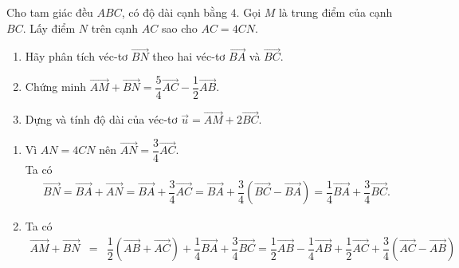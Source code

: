 \begin{bt}%
 Cho tam giác đều $ABC$, có độ dài cạnh bằng $4$. Gọi $M$ là trung điểm của cạnh $BC$. Lấy điểm $N$ trên cạnh $AC$ sao cho $AC=4CN$.
 \begin{enumerate}
  \item Hãy phân tích véc-tơ $\overrightarrow{BN}$ theo hai véc-tơ $\overrightarrow{BA}$ và $\overrightarrow{BC}$.
  \item Chứng minh $\overrightarrow{AM} + \overrightarrow{BN} = \dfrac{5}{4}\overrightarrow{AC}-\dfrac{1}{2}\overrightarrow{AB}$.
  \item Dựng và tính độ dài của véc-tơ $\overrightarrow{u}= \overrightarrow{AM} + 2\overrightarrow{BC}$.
 \end{enumerate}
 \loigiai
  {
  \begin{center}
  \end{center}
  \begin{enumerate}
   \item Vì $AN=4CN$ nên $\overrightarrow{AN}=\dfrac{3}{4}\overrightarrow{AC}$.\\
   Ta có
   \allowdisplaybreaks
   \begin{eqnarray*}
    \overrightarrow{BN} = \overrightarrow{BA} + \overrightarrow{AN} = \overrightarrow{BA} + \dfrac{3}{4}\overrightarrow{AC} = \overrightarrow{BA} + \dfrac{3}{4} \left(\overrightarrow{BC} - \overrightarrow{BA}\right) = \dfrac{1}{4}\overrightarrow{BA} + \dfrac{3}{4}\overrightarrow{BC}.
   \end{eqnarray*}
   \item Ta có
   \allowdisplaybreaks
   \begin{eqnarray*}
    \overrightarrow{AM} + \overrightarrow{BN} &=& \dfrac{1}{2}\left(\overrightarrow{AB} + \overrightarrow{AC}\right) + \dfrac{1}{4}\overrightarrow{BA} + \dfrac{3}{4}\overrightarrow{BC} = \dfrac{1}{2}\overrightarrow{AB}-\dfrac{1}{4}\overrightarrow{AB} + \dfrac{1}{2}\overrightarrow{AC} + \dfrac{3}{4}\left(\overrightarrow{AC}-\overrightarrow{AB}\right)\\

\end{eqnarray*}
\end{enumerate}}
\end{bt}
